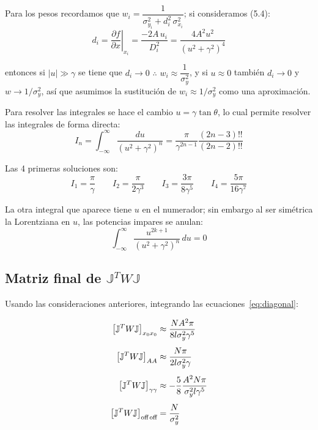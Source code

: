 Para los pesos recordamos que $w_i = \dfrac{1}{\sigma_{y_i}^2 + d_i^2\,\sigma_{x_i}^2}$; si consideramos (5.4):
\begin{equation}
    d_i = \left.\frac{\partial f}{\partial x}\right|_{x_i} = \frac{-2A\,u_i}{D_i^2} = \frac{4A^2 u^2}{(u^2+\gamma^2)^4}
\end{equation}

entonces si $|u| \gg \gamma$ se tiene que $d_i \to 0$ $\therefore$ $w_i \approx \dfrac{1}{\sigma_y^2}$, y si $u \approx 0$ también $d_i \to 0$ y $w \to 1/\sigma_y^2$, así que asumimos la sustitución de $w_i \approx 1/\sigma_y^2$ como una aproximación.

Para resolver las integrales se hace el cambio $u = \gamma\tan\theta$, lo cual permite resolver las integrales de forma directa:
\begin{equation}
    I_n = \int_{-\infty}^{\infty} \frac{du}{(u^2+\gamma^2)^n} = \frac{\pi}{\gamma^{2n-1}} \frac{(2n-3)!!}{(2n-2)!!}
\end{equation}

Las 4 primeras soluciones son:
\begin{equation}
    I_1 = \frac{\pi}{\gamma} \qquad I_2 = \frac{\pi}{2\gamma^3} \qquad I_3 = \frac{3\pi}{8\gamma^5} \qquad I_4 = \frac{5\pi}{16\gamma^7}
\end{equation}

La otra integral que aparece tiene $u$ en el numerador; sin embargo al ser simétrica la Lorentziana en $u$, las potencias impares se anulan:
\begin{equation}
    \int_{-\infty}^{\infty} \frac{u^{2k+1}}{(u^2+\gamma^2)^n}\,du = 0
\end{equation}

\subsection{Matriz final de \texorpdfstring{$\mathbb{J}^T W \mathbb{J}$}{J^T W J}}

Usando las consideraciones anteriores, integrando las ecuaciones~\ref{eq:diagonal}:

\begin{align}
    \left[\mathbb{J}^T W \mathbb{J}\right]_{x_0 x_0} &\approx \frac{N A^2 \pi}{8l\sigma_y^2\gamma^5} \\[4pt]
    \left[\mathbb{J}^T W \mathbb{J}\right]_{AA} &\approx \frac{N\pi}{2l\sigma_y^2\gamma} \\[4pt]
    \left[\mathbb{J}^T W \mathbb{J}\right]_{\gamma\gamma} &\approx -\frac{5}{8}\frac{A^2 N\pi}{\sigma_y^2 l\gamma^5} \\[4pt]
    \left[\mathbb{J}^T W \mathbb{J}\right]_{\text{off\,off}} &= \frac{N}{\sigma_y^2}
\end{align}


